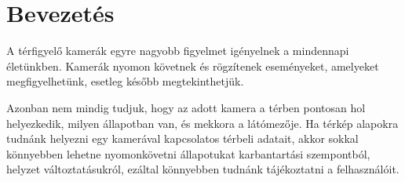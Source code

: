 \makeatletter
\def\thickhrulefill{\leavevmode \leaders \hrule height 1ex \hfill \kern \z@}
\def\@makechapterhead#1{%
  \vspace*{10\p@}%
  {\parindent \z@ \centering \reset@font
        {\Huge \scshape \thechapter}
        \par\nobreak
        \vspace*{15\p@}%
        \interlinepenalty\@M
        \begin{tabular}{@{\qquad}c@{\qquad}}
          \hline
          \\
          {\Huge \bfseries #1\par\nobreak} \\
          \\
          \hline
        \end{tabular}
    \vskip 100\p@
  }}
\def\@makeschapterhead#1{%
  \vspace*{10\p@}%
  {\parindent \z@ \centering \reset@font
        {\Huge \scshape \vphantom{\thechapter}}
        \par\nobreak
        \vspace*{15\p@}%
        \interlinepenalty\@M
        \begin{tabular}{@{\qquad}c@{\qquad}}
          \hline
          \\
          {\Huge \bfseries #1\par\nobreak} \\
          \\
          \hline
        \end{tabular}
    \vskip 100\p@
  }}

\chapter{Bevezetés}
  A térfigyelő kamerák egyre nagyobb figyelmet igényelnek a mindennapi életünkben. Kamerák nyomon követnek és rögzítenek eseményeket, amelyeket megfigyelhetünk, esetleg később megtekinthetjük.
  
  
  Azonban nem mindig tudjuk, hogy az adott kamera a térben pontosan hol helyezkedik, milyen állapotban van, és mekkora a látómezője. Ha térkép alapokra tudnánk helyezni egy kamerával kapcsolatos térbeli adatait, akkor sokkal könnyebben lehetne nyomonkövetni állapotukat karbantartási szempontból, helyzet változtatásukról, ezáltal könnyebben tudnánk tájékoztatni a felhasználóit.
